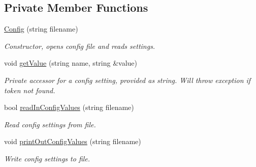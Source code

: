 \subsection*{Private Member Functions}
\begin{DoxyCompactItemize}
\item 
\hyperlink{class_config_a400b10f33c097937034125f52137719b}{Config} (string filename)
\begin{DoxyCompactList}\small\item\em Constructor, opens config file and reads settings. \end{DoxyCompactList}\item 
void \hyperlink{class_config_afbba804f1801b08f9da0738c036ced2d}{getValue} (string name, string \&value)
\begin{DoxyCompactList}\small\item\em Private accessor for a config setting, provided as string. Will throw exception if token not found. \end{DoxyCompactList}\item 
bool \hyperlink{class_config_af9b25268be98a69ee7880685a3a3ec5c}{readInConfigValues} (string filename)
\begin{DoxyCompactList}\small\item\em Read config settings from file. \end{DoxyCompactList}\item 
void \hyperlink{class_config_ab770b1b9ef902ee717d189f015aea9e1}{printOutConfigValues} (string filename)
\begin{DoxyCompactList}\small\item\em Write config settings to file. \end{DoxyCompactList}\end{DoxyCompactItemize}
